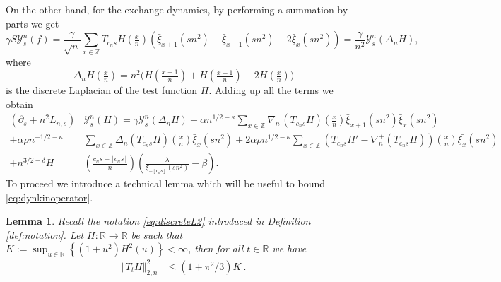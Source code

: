 \documentclass[a4paper, reqno, 12pt]{amsart}
\theoremstyle{plain}
\newtheorem{lemma}[definition]{Lemma}
\theoremstyle{definition}
\newcommand{\floor}[1]{\left\lfloor #1 \right\rfloor}
\newcommand{\R}{\mathbb{R}}
\begin{document}
On the other hand, for the exchange dynamics, by performing a summation by parts we get
\begin{equation*}
    \gamma S\mathcal{Y}^n_s(f) = \frac{\gamma}{\sqrt{n}} \sum_{x\in\mathbb{Z}} T_{c_n s}H(\tfrac{x}{n}) ({\bar \xi_{x+1}}(sn^2)+{\bar\xi_{x-1}}(sn^2)-2{\bar\xi_x}(sn^2)) = \frac{\gamma}{n^2} \mathcal{Y}^n_s(\Delta_nH) ,
\end{equation*}
where $$\Delta_nH(\tfrac xn) = n^2\big(H(\tfrac {x+1}{n})+H(\tfrac{x-1}{n})- 2H(\tfrac xn))$$ is the discrete Laplacian of the test function $H$.
Adding up all the terms we obtain
\begin{equation} \label{eq:dynkinoperator}
    \begin{split}
        (\partial_s + n^2L_{n,s})&\mathcal{Y}^n_s(H)= \gamma\mathcal{Y}^n_s(\Delta_nH) -\alpha  n^{1/2-\kappa} \sum_{x\in\mathbb{Z}} \nabla^+_n (T_{c_n s}H)(\tfrac{x}{n}) {\bar\xi_{x+1}(sn^2)}{\bar\xi_x}(sn^2)\\
         + \alpha \rho n^{-1/2-\kappa}&\sum_{x\in\mathbb{Z}} \Delta_n (T_{c_n s}H)(\tfrac{x}{n}){\bar\xi_x}(sn^2) +  2\alpha \rho n^{1/2-\kappa}\sum_{x\in\mathbb{Z}}\left(T_{c_n s}H' - \nabla^+_n(T_{c_n s}H)\right) (\tfrac{x}{n})\bar{\xi_x}(sn^2)\\
          + n^{3/2-\delta} H&\left(\frac{c_ns - \lfloor c_ns \rfloor}{n}\right) \left(\frac{\lambda}{\xi_{-\floor{c_ns}}(sn^2)} -\beta\right).
    \end{split}
\end{equation}
To proceed we introduce a technical lemma which will be useful to bound \eqref{eq:dynkinoperator}.
\begin{lemma} 
\label{lem:L^2-normdiscrete}
   Recall the notation \eqref{eq:discreteL2} introduced in Definition \ref{def:notation}. Let $H:\R\to\R$ be such that  $K:= \sup_{u \in \mathbb R }  \left\{ (1+u^2) H^2(u) \right\}  <\infty$, then for all $t\in\R$ we have 
 \begin{equation}
 \label{eq:Leander2}
    \begin{split}
        \left\Vert T_{t} H\right\Vert_{2,n}^2 & \leq  (1+\pi^2/3) K  \ .
        \end{split}
    \end{equation}
\end{lemma}
\end{document}
